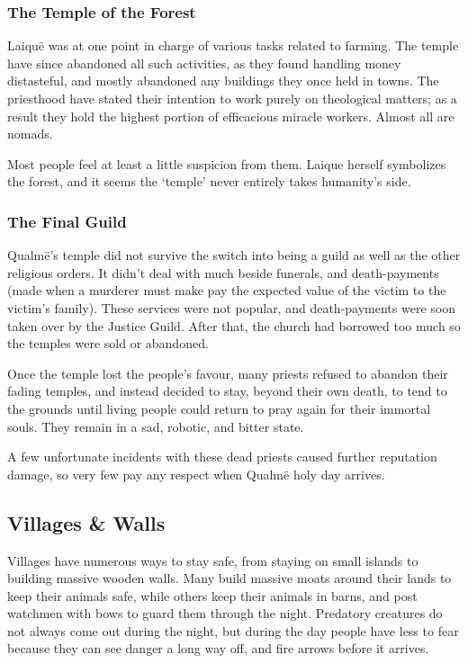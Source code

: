 \begin{multicols}{2}
\subsubsection{The Temple of the Forest}

Laiqu\"{e} was at one point in charge of various tasks related to farming.
The temple have since abandoned all such activities, as they found handling money distasteful, and mostly abandoned any buildings they once held in towns.
The priesthood have stated their intention to work purely on theological matters; as a result they hold the highest portion of efficacious miracle workers.
Almost all are \glspl{nomad}.

Most people feel at least a little suspicion from them.
Laique herself symbolizes the forest, and it seems the `temple' never entirely takes humanity's side.

\subsubsection{The Final Guild}

Qualm\"{e}'s temple did not survive the switch into being a guild as well as the other religious orders.
It didn't deal with much beside funerals, and death-payments (made when a murderer must make pay the expected value of the victim to the victim's family).
These services were not popular, and death-payments were soon taken over by the Justice Guild.
After that, the church had borrowed too much so the temples were sold or abandoned.

Once the temple lost the people's favour, many priests refused to abandon their fading temples, and instead decided to stay, beyond their own death, to tend to the grounds until living people could return to pray again for their immortal souls.
They remain in a sad, robotic, and bitter state.

A few unfortunate incidents with these dead priests caused further reputation damage, so very few pay any respect when Qualm\"e holy day arrives.

\subsection{Villages \& Walls}

Villages have numerous ways to stay safe, from staying on small islands to building massive wooden walls.
Many build massive moats around their lands to keep their animals safe, while others keep their animals in barns, and post watchmen with bows to guard them through the night.
Predatory creatures do not always come out during the night, but during the day people have less to fear because they can see danger a long way off, and fire arrows before it arrives.


\end{multicols}
